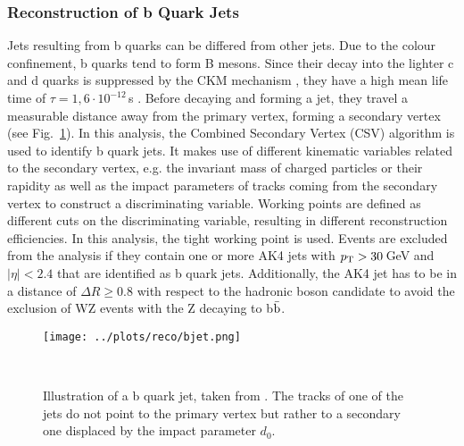 \subsubsection*{Reconstruction of b Quark Jets}
Jets resulting from b quarks can be differed from other jets. Due to the colour confinement, b quarks tend to form B mesons. Since their decay into the lighter c and d quarks is suppressed by the CKM mechanism \cite{CKM}, they have a high mean life time of $\tau=1,6\cdot 10^{-12}$\,s \cite{SMmasses}. Before decaying and forming a jet, they travel a measurable distance away from the primary vertex, forming a secondary vertex (see Fig.~\ref{fig:reco:bjet}). In this analysis, the Combined Secondary Vertex (CSV) algorithm \cite{CSV} is used to identify b quark jets. It makes use of different kinematic variables related to the secondary vertex, e.g. the invariant mass of charged particles or their rapidity as well as the impact parameters of tracks coming from the secondary vertex to construct a discriminating variable. Working points are defined as different cuts on the discriminating variable, resulting in different reconstruction efficiencies. In this analysis, the tight working point is used. Events are excluded from the analysis if they contain one or more AK4 jets with $p_{\rm T}>30$\,GeV and $|\eta|<2.4$ that are identified as b quark jets. Additionally, the AK4 jet has to be in a distance of $\Delta R \geq 0.8$ with respect to the hadronic boson candidate to avoid the exclusion of WZ events with the Z decaying to b$\bar{\rm b}$.
\begin{figure}
    \centering
    \texttt{[image: ../plots/reco/bjet.png]}
    \caption[Illustration of a b quark jet]{Illustration of a b quark jet, taken from \cite{bjet}. The tracks of one of the jets do not point to the primary vertex but rather to a secondary one displaced by the impact parameter $d_0$.}\
    \label{fig:reco:bjet}
\end{figure}

